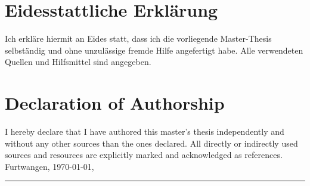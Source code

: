 \thispagestyle{empty}
\section*{Eidesstattliche Erklärung}
Ich erkläre hiermit an Eides statt, dass ich die vorliegende Master-Thesis selbständig und ohne unzulässige fremde Hilfe angefertigt habe. Alle verwendeten Quellen und Hilfsmittel sind angegeben.


\section*{Declaration of Authorship}
I hereby declare that I have authored this master's thesis independently and without any other sources than the ones declared. All directly or indirectly used sources and resources are explicitly marked and acknowledged as references.\\

\hfill Furtwangen, \today,

\vspace{1cm}
\hfill
\begin{minipage}[t]{5cm}
	\rule{5cm}{0.4pt}\\
\end{minipage}


